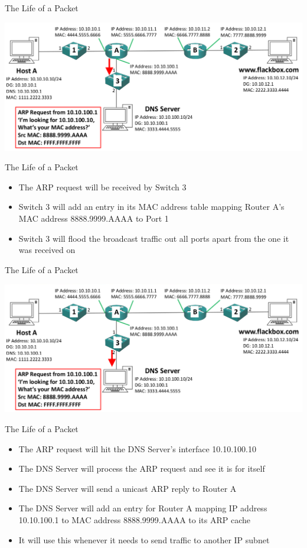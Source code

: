 \documentclass[pdflatex,compress,mathserif]{beamer}
\begin{document}
\begin{frame}{The Life of a Packet}
	\begin{center}
		\includegraphics[width=\linewidth]{img/img23}
	\end{center}
\end{frame}

\begin{frame}{The Life of a Packet}
	\begin{itemize}
		\item The ARP request will be received by Switch 3 
		\item Switch 3 will add an entry in its MAC address table mapping Router A’s MAC address 8888.9999.AAAA to Port 1
		\item Switch 3 will flood the broadcast traffic out all ports apart from the one it was received on
	\end{itemize}
\end{frame}

\begin{frame}{The Life of a Packet}
	\begin{center}
		\includegraphics[width=\linewidth]{img/img24}
	\end{center}
\end{frame}

\begin{frame}{The Life of a Packet}
	\begin{itemize}
		\item The ARP request will hit the DNS Server’s interface 10.10.100.10
		\item The DNS Server will process the ARP request and see it is for itself
		\item The DNS Server will send a unicast ARP reply to Router A
		\item The DNS Server will add an entry for Router A mapping IP address 10.10.100.1 to MAC address 8888.9999.AAAA to its ARP cache
		\item It will use this whenever it needs to send traffic to another IP subnet
	\end{itemize}
\end{frame}
\end{document}
